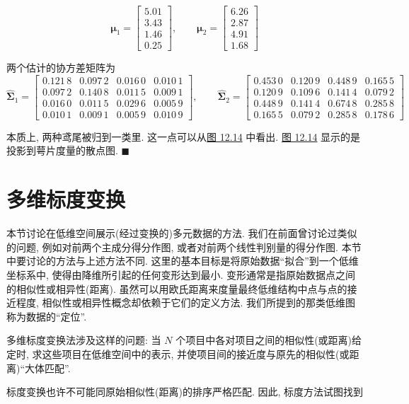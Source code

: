 
\[
\boldsymbol{\mu}_1=\begin{bmatrix}5.01\\3.43\\1.46\\0.25\end{bmatrix}, \qquad
\boldsymbol{\mu}_2=\begin{bmatrix}6.26\\2.87\\4.91\\1.68\end{bmatrix}
\]

两个估计的协方差矩阵为
\[
\hat{\boldsymbol{\Sigma}}_1=\begin{bmatrix}
0.121\,8 & 0.097\,2 & 0.016\,0 & 0.010\,1\\
0.097\,2 & 0.140\,8 & 0.011\,5 & 0.009\,1\\
0.016\,0 & 0.011\,5 & 0.029\,6 & 0.005\,9\\
0.010\,1 & 0.009\,1 & 0.005\,9 & 0.010\,9
\end{bmatrix}, \qquad
\hat{\boldsymbol{\Sigma}}_2=\begin{bmatrix}
0.453\,0 & 0.120\,9 & 0.448\,9 & 0.165\,5\\
0.120\,9 & 0.109\,6 & 0.141\,4 & 0.079\,2\\
0.448\,9 & 0.141\,4 & 0.674\,8 & 0.285\,8\\
0.165\,5 & 0.079\,2 & 0.285\,8 & 0.178\,6
\end{bmatrix}
\]

本质上, 两种鸢尾被归到一类里. 这一点可以从\hyperref[fig:12.14]{图 12.14} 中看出. \hyperref[fig:12.14]{图 12.14} 显示的是投影到萼片度量的散点图. \hfill$\blacksquare$

\begin{mvfigure}
\label{fig:12.14}
\end{mvfigure}

\vspace{0.5em}
\section{多维标度变换}
\label{sec:12.6}

本节讨论在低维空间展示(经过变换的)多元数据的方法. 我们在前面曾讨论过类似的问题, 例如对前两个主成分得分作图, 或者对前两个线性判别量的得分作图. 本节中要讨论的方法与上述方法不同. 这里的基本目标是将原始数据“拟合”到一个低维坐标系中, 使得由降维所引起的任何变形达到最小. 变形通常是指原始数据点之间的相似性或相异性(距离). 虽然可以用欧氏距离来度量最终低维结构中点与点的接近程度, 相似性或相异性概念却依赖于它们的定义方法. 我们所提到的那类低维图称为数据的“定位”.

多维标度变换法涉及这样的问题: 当 $N$ 个项目中各对项目之间的相似性(或距离)给定时, 求这些项目在低维空间中的表示, 并使项目间的接近度与原先的相似性(或距离)“大体匹配”.

标度变换也许不可能同原始相似性(距离)的排序严格匹配. 因此, 标度方法试图找到
